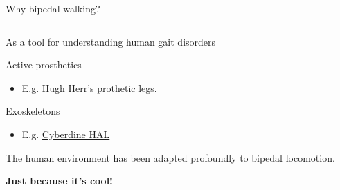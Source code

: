 \documentclass[compress]{beamer}
\begin{document}
\begin{frame}{Why bipedal walking?}

    \begin{columns}
        \begin{column}{0.5\linewidth}
    As a tool for understanding human gait disorders

    Active prosthetics

    \begin{itemize}

        \item E.g.
            \href{https://www.ted.com/talks/hugh_herr_the_new_bionics_that_let_us_run_climb_and_dance?language=en}{Hugh
            Herr's prothetic legs}.
    \end{itemize}

    Exoskeletons

    \begin{itemize}

        \item E.g. \href{http://www.youtube.com/watch?v=2Ysb-Oko3Bg}{Cyberdine HAL}
    \end{itemize}

    The human environment has been adapted profoundly to bipedal locomotion.

    \textbf{Just because it's cool!}
            

\end{column}
\end{columns}
\end{frame}
\end{document}
